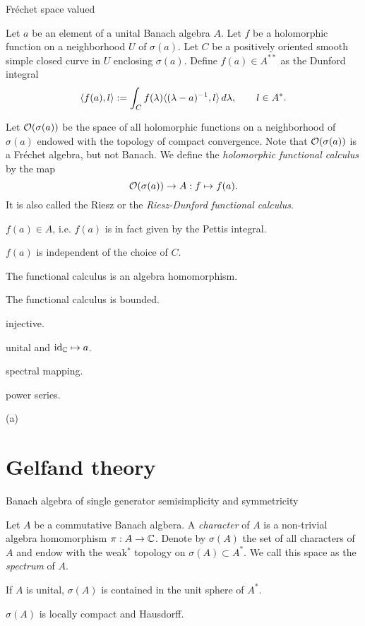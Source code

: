 \documentclass{../../large}
\begin{document}
Fr\'echet space valued 

\begin{prb}
Let $a$ be an element of a unital Banach algebra $A$.
Let $f$ be a holomorphic function on a neighborhood $U$ of $\sigma(a)$.
Let $C$ be a positively oriented smooth simple closed curve in $U$ enclosing $\sigma(a)$.
Define $f(a)\in A^{**}$ as the Dunford integral
\[\langle f(a),l\rangle:=\int_Cf(\lambda)\langle(\lambda-a)^{-1},l\rangle\,d\lambda,\qquad l\in A^*.\]

Let $\mathcal{O}(\sigma(a))$ be the space of all holomorphic functions on a neighborhood of $\sigma(a)$ endowed with the topology of compact convergence.
Note that $\mathcal{O}(\sigma(a))$ is a Fr\'echet algebra, but not Banach.
We define the \emph{holomorphic functional calculus} by the map
\[\mathcal{O}(\sigma(a))\to A:f\mapsto f(a).\]
It is also called the Riesz or the \emph{Riesz-Dunford functional calculus}.
\begin{parts}
\item $f(a)\in A$, i.e. $f(a)$ is in fact given by the Pettis integral.
\item $f(a)$ is independent of the choice of $C$.
\item The functional calculus is an algebra homomorphism.
\item The functional calculus is bounded.
\item injective.
\item unital and $\operatorname{id}_{\mathbb{C}}\mapsto a$.
\item spectral mapping.
\item power series.
\end{parts}
\end{prb}
\begin{pf}
(a)


\end{pf}





\section{Gelfand theory}

Banach algebra of single generator
semisimplicity and symmetricity

\begin{prb}
Let $A$ be a commutative Banach algbera.
A \emph{character} of $A$ is a non-trivial algebra homomorphism $\pi:A\to\mathbb{C}$.
Denote by $\sigma(A)$ the set of all characters of $A$ and endow with the weak$^*$ topology on $\sigma(A)\subset A^*$.
We call this space as the \emph{spectrum} of $A$.
\begin{parts}
\item If $A$ is unital, $\sigma(A)$ is contained in the unit sphere of $A^*$.
\item $\sigma(A)$ is locally compact and Hausdorff.
\end{parts}
\end{prb}
\begin{pf}

\end{pf}
\end{document}
